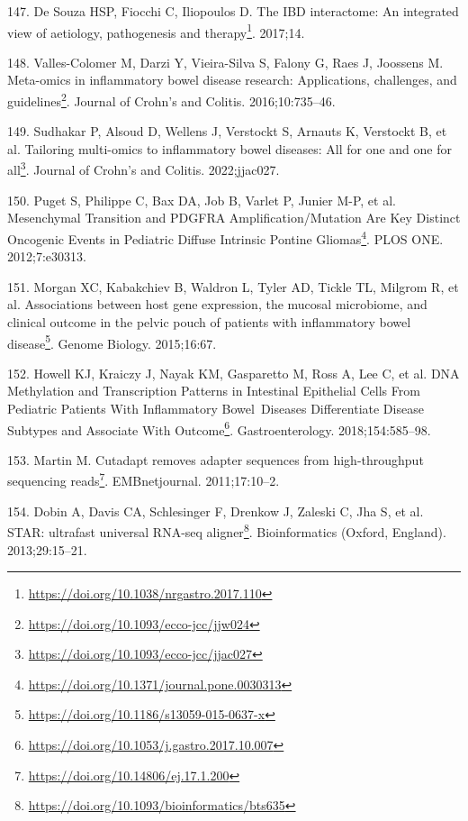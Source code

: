 \documentclass[
  a4paper,
]{book}
\DeclareRobustCommand{\href}[2]{#2\footnote{\url{#1}}}
\newlength{\cslhangindent}
\newlength{\cslentryspacingunit} %
\newenvironment{CSLReferences}[2] %
 {%
  \setlength{\parindent}{0pt}
  \ifodd #1
  \let\oldpar\par
  \def\par{\hangindent=\cslhangindent\oldpar}
  \fi
  \setlength{\parskip}{#2\cslentryspacingunit}
 }%
 {}
\begin{document}
\begin{CSLReferences}{0}{0}
\leavevmode{}%
147. De Souza HSP, Fiocchi C, Iliopoulos D. \href{https://doi.org/10.1038/nrgastro.2017.110}{The {IBD} interactome: {An} integrated view of aetiology, pathogenesis and therapy}. 2017;14.

\leavevmode{}%
148. Valles-Colomer M, Darzi Y, Vieira-Silva S, Falony G, Raes J, Joossens M. \href{https://doi.org/10.1093/ecco-jcc/jjw024}{Meta-omics in inflammatory bowel disease research: Applications, challenges, and guidelines}. Journal of Crohn's and Colitis. 2016;10:735--46.

\leavevmode{}%
149. Sudhakar P, Alsoud D, Wellens J, Verstockt S, Arnauts K, Verstockt B, et al. \href{https://doi.org/10.1093/ecco-jcc/jjac027}{Tailoring multi-omics to inflammatory bowel diseases: All for one and one for all}. Journal of Crohn's and Colitis. 2022;jjac027.

\leavevmode{}%
150. Puget S, Philippe C, Bax DA, Job B, Varlet P, Junier M-P, et al. \href{https://doi.org/10.1371/journal.pone.0030313}{Mesenchymal Transition and PDGFRA Amplification/Mutation Are Key Distinct Oncogenic Events in Pediatric Diffuse Intrinsic Pontine Gliomas}. PLOS ONE. 2012;7:e30313.

\leavevmode{}%
151. Morgan XC, Kabakchiev B, Waldron L, Tyler AD, Tickle TL, Milgrom R, et al. \href{https://doi.org/10.1186/s13059-015-0637-x}{Associations between host gene expression, the mucosal microbiome, and clinical outcome in the pelvic pouch of patients with inflammatory bowel disease}. Genome Biology. 2015;16:67.

\leavevmode{}%
152. Howell KJ, Kraiczy J, Nayak KM, Gasparetto M, Ross A, Lee C, et al. \href{https://doi.org/10.1053/j.gastro.2017.10.007}{DNA Methylation and Transcription Patterns in Intestinal Epithelial Cells From Pediatric Patients With Inflammatory Bowel~Diseases Differentiate Disease Subtypes and Associate With Outcome}. Gastroenterology. 2018;154:585--98.

\leavevmode{}%
153. Martin M. \href{https://doi.org/10.14806/ej.17.1.200}{Cutadapt removes adapter sequences from high-throughput sequencing reads}. EMBnetjournal. 2011;17:10--2.

\leavevmode{}%
154. Dobin A, Davis CA, Schlesinger F, Drenkow J, Zaleski C, Jha S, et al. \href{https://doi.org/10.1093/bioinformatics/bts635}{STAR: ultrafast universal RNA-seq aligner}. Bioinformatics (Oxford, England). 2013;29:15--21.


\end{CSLReferences}
\end{document}
